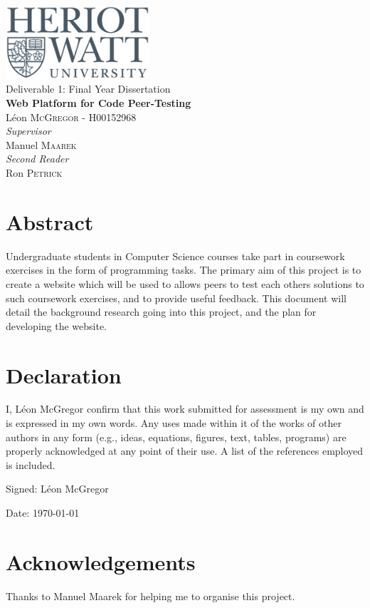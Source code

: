 \documentclass[a4paper,11pt]{report}
\newcommand{\titles}{\\\vspace{1cm}}
\begin{document}

\pagestyle{empty}

{\centering\Large
\includegraphics[width=0.4\textwidth]{../hwu.png}\titles
Deliverable 1: Final Year Dissertation\titles
{\huge\bfseries Web Platform for Code Peer-Testing\titles}
L\'eon \textsc{McGregor} - H00152968\titles
{\large\textit{Supervisor}\\}
Manuel \textsc{Maarek}\titles
{\large\textit{Second Reader}\\}
Ron \textsc{Petrick}\\
\vfill
}

\newpage
\tableofcontents
\newpage
\doublespacing


\section*{Abstract}
Undergraduate students in Computer Science courses take part in coursework exercises in the form of programming tasks. The primary aim of this project is to create a website which will be used to allows peers to test each others solutions to such coursework exercises, and to provide useful feedback. This document will detail the background research going into this project, and the plan for developing the website.

\vfill

\section*{Declaration}
I, L\'eon McGregor confirm that this work submitted for assessment is my own and is expressed in my own words. Any uses made within it of the works of other authors in any form (e.g., ideas, equations, figures, text, tables, programs) are properly acknowledged at any point of their use. A list of the references employed is included.\par
Signed: L\'eon McGregor\par
Date: \today

\vfill

\section*{Acknowledgements}
Thanks to Manuel Maarek for helping me to organise this project.
\end{document}
